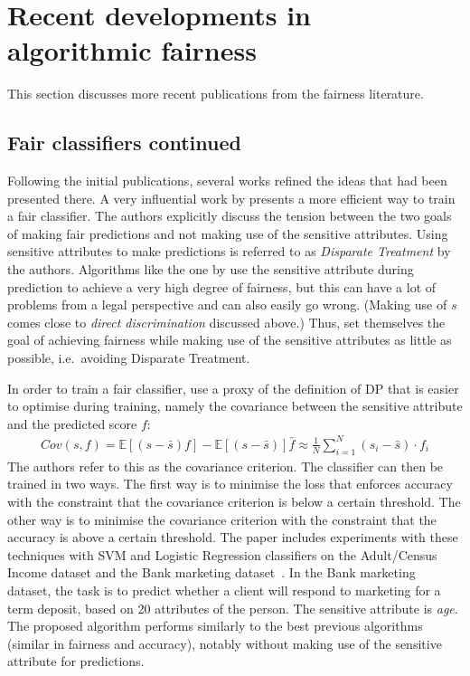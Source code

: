\section{Recent developments in algorithmic fairness}%
\label{sec:refinement-on-previous-ideas-for-fair-classification-and-fair-representations}
This section discusses more recent publications from the fairness literature.

\subsection{Fair classifiers continued}
Following the initial publications,
several works refined the ideas that had been presented there.
A very influential work by \citet{zafar2017fairnessconstraints}
presents a more efficient way to train a fair classifier.
The authors explicitly discuss the tension
between the two goals of making fair predictions and not making use of the sensitive attributes.
Using sensitive attributes to make predictions
is referred to as \emph{Disparate Treatment} by the authors.
Algorithms like the one by \citet{calders2009building} use the sensitive
attribute during prediction to achieve a very high degree of fairness, but this can have a
lot of problems from a legal perspective and can also easily go wrong.
(Making use of \(s\) comes close to \emph{direct discrimination} discussed above.)
Thus, \citet{zafar2017fairnessconstraints} set themselves the goal of achieving fairness while making use of the sensitive attributes
as little as possible, i.e.~avoiding Disparate Treatment.

In order to train a fair classifier, \citet{zafar2017fairnessconstraints} use a proxy of the definition of
\ac{DP} that is easier to optimise during training, namely the covariance
between the sensitive attribute and the predicted score \(f\):
\begin{align}
  \label{eq:zafar-constraint}
  Cov(s, f) = \mathbb{E}[(s - \bar{s})f] - \mathbb{E}[(s - \bar{s})]\bar{f} \approx 
  \frac{1}{N} \sum\limits_{i=1}^{N} (s_i - \bar{s}) \cdot f_i
\end{align}
The authors refer to this as the covariance criterion.
The classifier can then be trained in two ways.
The first way is to minimise the loss that enforces accuracy
with the constraint that the covariance criterion is below a certain threshold.
The other way is to minimise the covariance criterion
with the constraint that the accuracy is above a certain threshold.
The paper includes experiments with these techniques with SVM and Logistic Regression classifiers
on the Adult/Census Income dataset and the Bank marketing dataset~\citep{Dua:2017}.
In the Bank marketing dataset, the task is to predict whether a client will respond to marketing for a term deposit,
based on 20 attributes of the person.
The sensitive attribute is \emph{age}.
The proposed algorithm performs similarly to the best previous algorithms (similar in fairness and accuracy),
notably without making use of the sensitive attribute for predictions.

